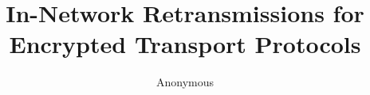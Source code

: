 \newcommand{\Sys}{Packrat\xspace}
\newcommand{\sys}{packrat\xspace}

\usepackage{microtype}



\newcommand{\keith}[1]{\textcolor{red}{{\sf (KW: #1)}}}
\newcommand{\thea}[1]{\textcolor{red}{{\sf (TR: #1)}}}
\newcommand{\gina}[1]{\textcolor{red}{\sf {(GY: #1)}}}
\newcommand{\michael}[1]{\textcolor{red}{\sf {(MW: #1)}}}

\date{}

\title{\Large \bf In-Network Retransmissions for Encrypted Transport Protocols}

\author{
Anonymous
} %

\maketitle




% 




% 

% 






